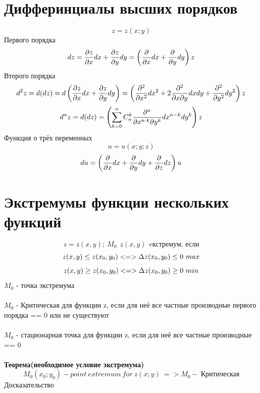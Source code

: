 \documentclass{article}
\begin{document}
\section{Дифферинциалы высших порядков}
\begin{equation}
    z = z(x;y)
\end{equation}
Первого порядка
\begin{equation*}
    dz = \pdv{z}{x}dx + \pdv{z}{y} dy = \left(\pdv{}{x}dx + \pdv{}{y}dy\right)z
\end{equation*}
Второго порядка
\begin{equation*}
    d^2z = d(dz) = d\left(\pdv{z}{x}dx + \pdv{z}{y} dy\right) = \left(\pdv{^2}{x^2}dx^2 + 2\pdv{^2}{x\partial y }dxdy + \pdv{^2}{y^2}dy^2\right)z
\end{equation*}
\begin{equation*}
    d^n z = d(dz) = \left(\sum_{k=0}^{n}C_n^k\pdv{^n}{x^{n\cdot k}\partial y^k}dx^{n-k}dy^k\right)z
\end{equation*}
Функция о трёх переменных
\begin{equation}
    u = u(x;y;z)
\end{equation}
\begin{equation*}
    du = \left(\pdv{}{x}dx+\pdv{}{y}dy+\pdv{}{z}dz\right)u
\end{equation*}

\section{Экстремумы функции нескольких функций}
\begin{equation*}
    z =z(x,y);\ M_0\ \ z(x,y)\ \ \text{eкстремум, если}
\end{equation*}
\begin{equation*}
    z(x,y) \leq z(x_0, y_0) <=> \Delta z(x_0, y_0) \leq 0 \-\ max
\end{equation*}
\begin{equation*}
    z(x,y) \geq z(x_0, y_0) <=> \Delta z(x_0, y_0) \geq 0 \-\ min
\end{equation*}
$M_0 $ - точка экстремума
\\ \\
$M_0$ - Критическая для функции z, если для неё все частные производные первого порядка == 0 или не существуют
\\ \\
$M_0$ - стационарная точка для функции z, если для неё все частные производные  == 0
\\ \\ 
\textbf{Теорема(необходимое условие экстремума)}
\begin{equation*}
    M_0(x_0; y_0) - point\ extremum\ for\ z(x;y)\ => M_0-\ \text{Критическая}
\end{equation*}
Досказательство
\end{document}
